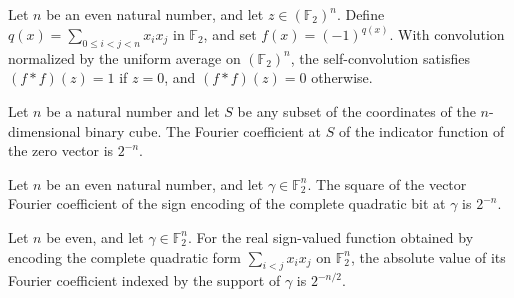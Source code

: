 \begin{theorem}
\label{FABL.convolution_completeQuadratic_self}
\leanok
{}
Let $n$ be an even natural number, and let $z\in (\mathbb{F}_2)^n$. Define
$q(x)=\sum_{0\le i<j<n}x_i x_j$ in $\mathbb{F}_2$, and set $f(x)=(-1)^{q(x)}$. With
convolution normalized by the uniform average on $(\mathbb{F}_2)^n$, the
self-convolution satisfies $(f*f)(z)=1$ if $z=0$, and $(f*f)(z)=0$ otherwise.
\end{theorem}

\begin{theorem}
\label{FABL.binaryFourierCoeff_singletonIndicator}
\leanok
{}
Let $n$ be a natural number and let $S$ be any subset of the coordinates of the
$n$-dimensional binary cube. The Fourier coefficient at $S$ of the indicator function of
the zero vector is $2^{-n}$.
\end{theorem}

\begin{theorem}
\label{FABL.vectorFourierCoeff_completeQuadratic_sq}
\leanok
{}
Let $n$ be an even natural number, and let $\gamma\in\mathbb F_2^n$. The square of the
vector Fourier coefficient of the sign encoding of the complete quadratic bit at
$\gamma$ is $2^{-n}$.
\end{theorem}

\begin{theorem}
\label{FABL.abs_vectorFourierCoeff_completeQuadratic}
\leanok
{}
Let $n$ be even, and let $\gamma\in\mathbb F_2^n$. For the real sign-valued function
obtained by encoding the complete quadratic form $\sum_{i<j}x_i x_j$ on $\mathbb F_2^n$,
the absolute value of its Fourier coefficient indexed by the support of $\gamma$ is
$2^{-n/2}$.
\end{theorem}

